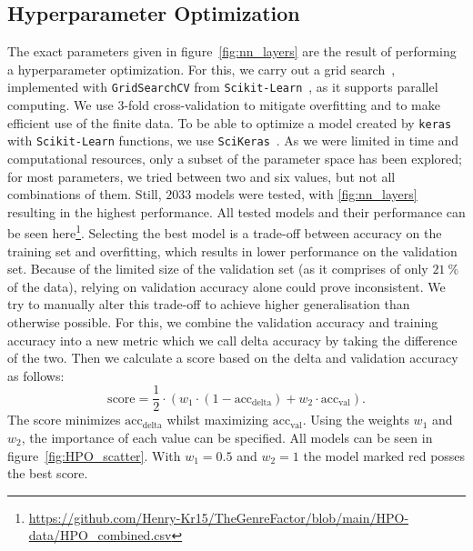 \documentclass[
  12pt,
  bibliography=totoc,     %
  captions=tableheading,  %
  titlepage=firstiscover, %
]{scrartcl}
\begin{document}
\subsection{Hyperparameter Optimization}
The exact parameters given in figure~\ref{fig:nn_layers} are the result of performing a hyperparameter optimization. For this, we carry out a
grid search~\cite{gridsearch}, implemented with \texttt{GridSearchCV} from \texttt{Scikit-Learn}~\cite{scikit-learn}, as it supports parallel computing.
We use $3$-fold cross-validation  to mitigate overfitting and to make efficient use of the finite data.
To be able to optimize a model created by \texttt{keras} with \texttt{Scikit-Learn} functions, we use \texttt{SciKeras}~\cite{scikeras}. As we were limited in time and
computational resources, only a subset of the parameter space has been explored; for most parameters, we tried between two and six values, but
not all combinations of them. Still, $2033$ models were tested, with \ref{fig:nn_layers} resulting in the highest performance. All tested models and their performance can be
seen here\footnote{\url{https://github.com/Henry-Kr15/TheGenreFactor/blob/main/HPO-data/HPO_combined.csv}}.
Selecting the best model is a trade-off between accuracy on the training set and overfitting, which results in lower performance on the validation set. Because of the limited
size of the validation set (as it comprises of only $\SI{21}{\percent}$ of the data), relying on validation accuracy alone could prove inconsistent. We try to manually alter
this trade-off to achieve higher generalisation than otherwise possible. For this, we combine the validation accuracy and training accuracy into a new metric which we call
delta accuracy by taking the difference of the two. Then we calculate a score based on the delta and validation accuracy as follows:
\begin{equation}
	\text{score} = \frac{1}{2} \cdot (w_{1} \cdot (1 - \text{acc}_{\text{delta}}) + w_{2} \cdot \text{acc}_{\text{val}}).
  \label{eqn:score}
\end{equation}
The score minimizes $\text{acc}_{\text{delta}}$ whilst maximizing $\text{acc}_{\text{val}}$. Using the weights $w_{1}$ and $w_{2}$, the importance of each value can be specified.
All models can be seen in figure~\ref{fig:HPO_scatter}. With $w_{1}=0.5$ and $w_{2}=1$ the model marked red posses the best score.
\end{document}
